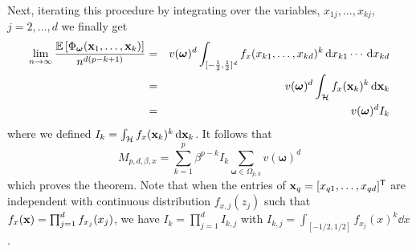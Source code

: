 \documentclass[11pt, draftcls, onecolumn, a4paper]{IEEEtran}
\newcommand{\xv}{{\bf x}}
\newcommand{\Hc}{{\cal H}}
\newcommand{\omegav}{\boldsymbol{\omega}}
\def\Tran{\mathsf{^T}}
\def\non{\nonumber\\}
\begin{document}
Next, iterating this procedure by integrating over the variables, $x_{1j},\ldots, x_{kj}$, $j=2,\ldots,d$ we finally get
\begin{eqnarray} \lim_{n \rightarrow \infty}\frac{\EE\left[\Phi_{\omegav} (\xv_1,\ldots,\xv_k) \right]}{n^{d(p-k+1)}} 
&=& v(\omegav)^d \int_{[-\frac{1}{2},\frac{1}{2}]^d} f_x(x_{k1}, \ldots ,x_{kd})^k \dd x_{k1} \cdots \dd x_{kd} \non
&=& v(\omegav)^d \int_{\Hc} f_x(\xv_k)^k \dd \xv_k \non
&=& v(\omegav)^d I_k
\end{eqnarray}
where we defined $I_k=\int_{\Hc}f_x(\xv_k)^k\dd \xv_k$.  It follows that
\[ M_{p,d,\beta,x} = \sum_{k=1}^p\beta^{p-k} I_k \sum_{\omegav \in \Omega_{p,k}}v(\omegav)^d \]
which proves the theorem. Note that when the entries of
$\xv_q=[x_{q1},\ldots,x_{qd}]\Tran$ are independent with continuous
distribution $f_{x,j}(z_j)$ such that $f_x(\xv) = \prod_{j=1}^d
f_{x_j}(x_j)$, we have $I_k = \prod_{j=1}^d I_{k,j}$ with
$I_{k,j}=\int_{[-1/2,1/2]} f_{x_j}(x)^k\dd x$.
\end{document}
